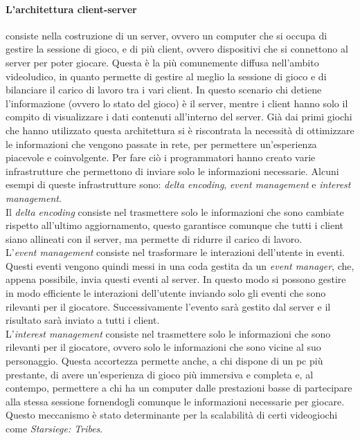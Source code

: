         \paragraph{L'architettura client-server} consiste nella costruzione di un server, ovvero un computer che si occupa di gestire la sessione di gioco, e di più client, ovvero
            dispositivi che si connettono al server per poter giocare. Questa è la più comunemente diffusa nell'ambito videoludico, in quanto permette di gestire al meglio la
            sessione di gioco e di bilanciare il carico di lavoro tra i vari client. In questo scenario chi detiene l'informazione (ovvero lo stato del gioco) è il server, mentre
            i client hanno solo il compito di visualizzare i dati contenuti all'interno del server. Già dai primi giochi che hanno utilizzato questa architettura
            si è riscontrata la necessità di ottimizzare le informazioni che vengono passate in rete, per permettere un'esperienza piacevole e coinvolgente. Per fare ciò i 
            programmatori hanno creato varie infrastrutture che permettono di inviare solo le informazioni necessarie. Alcuni esempi di queste infrastrutture sono: 
            \textit{delta encoding}, \textit{event management} e \textit{interest management}.\\
            Il \textit{delta encoding} consiste nel trasmettere solo le informazioni che sono cambiate rispetto all'ultimo aggiornamento, questo garantisce comunque che tutti
            i client siano allineati con il server, ma permette di ridurre il carico di lavoro.\\
            L'\textit{event management} consiste nel trasformare le interazioni dell'utente in eventi. Questi eventi vengono quindi messi in una coda gestita da un 
            \textit{event manager}, che, appena possibile, invia questi eventi al server. In questo modo si possono gestire in modo efficiente le interazioni dell'utente inviando
            solo gli eventi che sono rilevanti per il giocatore. Successivamente l'evento sarà gestito dal server e il risultato sarà inviato a tutti i client.\\
            L'\textit{interest management} consiste nel trasmettere solo le informazioni che sono rilevanti per il giocatore, ovvero solo le informazioni che sono vicine al suo 
            personaggio. Questa accortezza permette anche, a chi dispone di un pc più prestante, di avere un'esperienza di gioco più immersiva e completa e, al contempo, permettere 
            a chi ha un computer dalle prestazioni basse di partecipare alla stessa sessione fornendogli comunque le informazioni necessarie per giocare. Questo meccanismo è stato
            determinante per la scalabilità di certi videogiochi come \textit{Starsiege: Tribes}.\\

